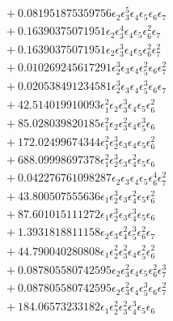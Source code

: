 \documentclass[10pt]{article}
\begin{document}
\begin{align*}
&{}  + 0.081951875359756 \epsilon_{2} \epsilon_{3}^{5} \epsilon_{4} \epsilon_{5} \epsilon_{6} \epsilon_{7} \\
&{}  + 0.16390375071951 \epsilon_{2} \epsilon_{3}^{4} \epsilon_{4} \epsilon_{5} \epsilon_{6}^{2} \epsilon_{7} \\
&{}  + 0.16390375071951 \epsilon_{2} \epsilon_{3}^{3} \epsilon_{4} \epsilon_{5} \epsilon_{6}^{2} \epsilon_{7}^{2} \\
&{}  + 0.010269245617291 \epsilon_{2}^{3} \epsilon_{3} \epsilon_{4} \epsilon_{5}^{2} \epsilon_{6} \epsilon_{7}^{2} \\
&{}  + 0.020538491234581 \epsilon_{2}^{3} \epsilon_{3} \epsilon_{4} \epsilon_{5}^{3} \epsilon_{6} \epsilon_{7} \\
&{}  + 42.514019910093 \epsilon_{1}^{2} \epsilon_{2} \epsilon_{3}^{3} \epsilon_{4} \epsilon_{5} \epsilon_{6}^{2} \\
&{}  + 85.028039820185 \epsilon_{1}^{2} \epsilon_{2} \epsilon_{3}^{2} \epsilon_{4} \epsilon_{5}^{3} \epsilon_{6} \\
&{}  + 172.02499674344 \epsilon_{1}^{2} \epsilon_{2}^{3} \epsilon_{3} \epsilon_{4} \epsilon_{5} \epsilon_{6}^{2} \\
&{}  + 688.09998697378 \epsilon_{1}^{2} \epsilon_{2}^{3} \epsilon_{3} \epsilon_{4}^{2} \epsilon_{5} \epsilon_{6} \\
&{}  + 0.042276761098287 \epsilon_{2} \epsilon_{3} \epsilon_{4} \epsilon_{5} \epsilon_{6}^{4} \epsilon_{7}^{2} \\
&{}  + 43.800507555636 \epsilon_{1} \epsilon_{2}^{3} \epsilon_{3} \epsilon_{4}^{2} \epsilon_{5} \epsilon_{6}^{2} \\
&{}  + 87.601015111272 \epsilon_{1} \epsilon_{2}^{3} \epsilon_{3} \epsilon_{4}^{3} \epsilon_{5} \epsilon_{6} \\
&{}  + 1.3931818811158 \epsilon_{2} \epsilon_{3} \epsilon_{4}^{2} \epsilon_{5}^{3} \epsilon_{6}^{2} \epsilon_{7} \\
&{}  + 44.790040280808 \epsilon_{1} \epsilon_{2}^{2} \epsilon_{3}^{2} \epsilon_{4} \epsilon_{5}^{2} \epsilon_{6}^{2} \\
&{}  + 0.087805580742595 \epsilon_{2} \epsilon_{3}^{2} \epsilon_{4} \epsilon_{5} \epsilon_{6}^{2} \epsilon_{7}^{3} \\
&{}  + 0.087805580742595 \epsilon_{2} \epsilon_{3}^{2} \epsilon_{4} \epsilon_{5}^{3} \epsilon_{6} \epsilon_{7}^{2} \\
&{}  + 184.06573233182 \epsilon_{1} \epsilon_{2}^{2} \epsilon_{3}^{2} \epsilon_{4}^{3} \epsilon_{5} \epsilon_{6} \\

\end{align*}
\end{document}
